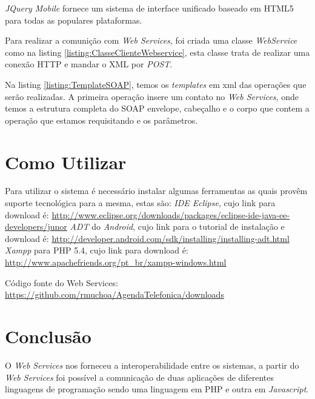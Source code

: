 \documentclass{acm_proc_article-sp}
\begin{document}
	\emph{JQuery Mobile} fornece um sistema de interface unificado baseado em HTML5 para todas as populares plataformas.\cite{JQUERYMOBILESITE}
	
	Para realizar a comunição com \emph{Web Services}, foi criada uma classe \emph{WebService} como na listing \ref{listing:ClasseClienteWebservice}, esta classe trata de realizar uma conexão HTTP e mandar o XML por \emph{POST}.
	
	
	
	Na listing \ref{listing:TemplateSOAP}, temos os \emph{templates} em xml das operações que serão realizadas. A primeira operação insere um contato no \emph{Web Services}, onde temos a estrutura completa do SOAP envelope, cabeçalho e o corpo que contem a operação que estamos requisitando e os parâmetros.
	
	
 
\section{Como Utilizar}
	
	Para utilizar o sistema é necessário instalar algumas ferramentas as quais provêm suporte tecnológica para a mesma, estas são:
	\emph{IDE Eclipse}, cujo link para download é: \url{http://www.eclipse.org/downloads/packages/eclipse-ide-java-ee-developers/junor}
	\emph{ADT} do \emph{Android}, cujo link para o tutorial de instalação e download é: \url{http://developer.android.com/sdk/installing/installing-adt.html}
	\emph{Xampp} para PHP 5.4, cujo link para download é: \url{ http://www.apachefriends.org/pt_br/xampp-windows.html}
	
	Código fonte do Web Services: \url{https://github.com/rmuchoa/AgendaTelefonica/downloads}
	
	
\section{Conclusão}
	
	O \emph{Web Services} nos forneceu a interoperabilidade entre os sistemas, a partir do \emph{Web Services} foi possível a comunicação de duas aplicações de diferentes linguagens de programação sendo uma linguagem em PHP e outra em \emph{Javascript}.


\end{document}
